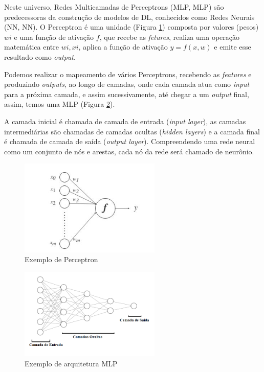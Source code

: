 Neste universo, Redes Multicamadas de Perceptrons (\acrlong{MLP}, \acrshort{MLP}) são predecessoras da construção de modelos de \acrshort{DL}, conhecidos como Redes Neurais (\acrlong{NN}, \acrshort{NN}). O Perceptron é uma unidade (Figura \ref{fig:perceptron}) composta por valores (pesos) $wi$ e uma função de ativação $f$,  que recebe as \textit{fetures}, realiza uma operação matemática entre $wi,xi$, aplica a função de ativação $y = f(x,w)$ e emite esse resultado como \textit{output}.

Podemos realizar o mapeamento de vários Perceptrons, recebendo as \textit{features} e produzindo \textit{outputs}, ao longo de camadas, onde cada camada atua como \textit{input} para a próxima camada, e assim sucessivamente, até chegar a
 um \textit{output} final, assim, temos uma \acrshort{MLP} (Figura \ref{fig:mlp}).
 
 
 A camada inicial é chamada de camada de entrada (\textit{input layer}), as camadas intermediárias são chamadas de camadas ocultas (\textit{hidden layers}) e a camada final é chamada de camada de saída (\textit{output layer}). Compreendendo uma rede neural como um conjunto de nós e arestas, cada nó da rede será chamado de neurônio.

\begin{figure}[!ht]
\centering
\includegraphics[width=0.6\textwidth]{img/perceptron.png}
\caption{\label{fig:perceptron}Exemplo de Perceptron}
\author{Fonte: Retirado de~\cite{12}}
\end{figure}

\begin{figure}[!h]
\centering
\includegraphics[width=0.6\textwidth]{img/mlp03.png}
\caption{\label{fig:mlp}Exemplo de arquitetura \acrshort{MLP}}

\end{figure}

